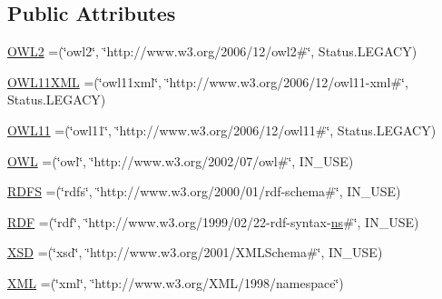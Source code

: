 \subsection*{Public Attributes}
\begin{DoxyCompactItemize}
\item 
\hyperlink{enumorg_1_1semanticweb_1_1owlapi_1_1vocab_1_1_namespaces_ae6d1d1c211d0540debf50f039d557151}{O\-W\-L2} =(\char`\"{}owl2\char`\"{}, \char`\"{}http\-://www.\-w3.\-org/2006/12/owl2\#\char`\"{}, Status.\-L\-E\-G\-A\-C\-Y)
\item 
\hyperlink{enumorg_1_1semanticweb_1_1owlapi_1_1vocab_1_1_namespaces_af36dd330a7d7bc2a25a65e50de1ad3ff}{O\-W\-L11\-X\-M\-L} =(\char`\"{}owl11xml\char`\"{}, \char`\"{}http\-://www.\-w3.\-org/2006/12/owl11-\/xml\#\char`\"{}, Status.\-L\-E\-G\-A\-C\-Y)
\item 
\hyperlink{enumorg_1_1semanticweb_1_1owlapi_1_1vocab_1_1_namespaces_a2c4112c773efd5b375d610e895f29b5f}{O\-W\-L11} =(\char`\"{}owl11\char`\"{}, \char`\"{}http\-://www.\-w3.\-org/2006/12/owl11\#\char`\"{}, Status.\-L\-E\-G\-A\-C\-Y)
\item 
\hyperlink{enumorg_1_1semanticweb_1_1owlapi_1_1vocab_1_1_namespaces_a2fcb537074d9307ef1356ffb6a5bd6f4}{O\-W\-L} =(\char`\"{}owl\char`\"{}, \char`\"{}http\-://www.\-w3.\-org/2002/07/owl\#\char`\"{}, I\-N\-\_\-\-U\-S\-E)
\item 
\hyperlink{enumorg_1_1semanticweb_1_1owlapi_1_1vocab_1_1_namespaces_a64d32d1177b8a61cc6da656defd88a5a}{R\-D\-F\-S} =(\char`\"{}rdfs\char`\"{}, \char`\"{}http\-://www.\-w3.\-org/2000/01/rdf-\/schema\#\char`\"{}, I\-N\-\_\-\-U\-S\-E)
\item 
\hyperlink{enumorg_1_1semanticweb_1_1owlapi_1_1vocab_1_1_namespaces_a0d1c7991e82e2b5c495bb87f1123ce30}{R\-D\-F} =(\char`\"{}rdf\char`\"{}, \char`\"{}http\-://www.\-w3.\-org/1999/02/22-\/rdf-\/syntax-\/\hyperlink{enumorg_1_1semanticweb_1_1owlapi_1_1vocab_1_1_namespaces_a88428054d2db7e7520b71b395aef20ac}{ns}\#\char`\"{}, I\-N\-\_\-\-U\-S\-E)
\item 
\hyperlink{enumorg_1_1semanticweb_1_1owlapi_1_1vocab_1_1_namespaces_ad23159b4298d8448c5af25510c8c7f13}{X\-S\-D} =(\char`\"{}xsd\char`\"{}, \char`\"{}http\-://www.\-w3.\-org/2001/X\-M\-L\-Schema\#\char`\"{}, I\-N\-\_\-\-U\-S\-E)
\item 
\hyperlink{enumorg_1_1semanticweb_1_1owlapi_1_1vocab_1_1_namespaces_ab711e79841c9a9cb42d72aabb1556578}{X\-M\-L} =(\char`\"{}xml\char`\"{}, \char`\"{}http\-://www.\-w3.\-org/X\-M\-L/1998/namespace\char`\"{})
\item 

\end{DoxyCompactItemize}
